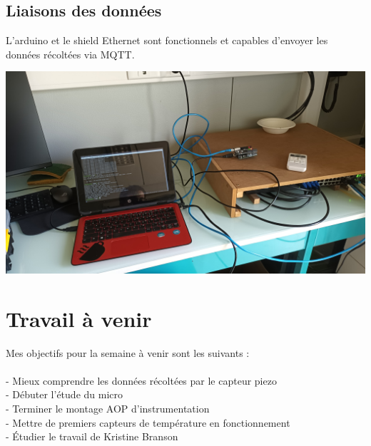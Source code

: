 \documentclass[12pt]{article}
\begin{document}
\subsection{Liaisons des données}
L'arduino et le shield Ethernet sont fonctionnels et capables d'envoyer les données récoltées via MQTT.
\begin{center}	
	\includegraphics[scale=0.08]{shieldethernet.jpg}
	\label{image5}
\end{center}
\section{Travail à venir}
Mes objectifs pour la semaine à venir sont les suivants :\\
\\
	- Mieux comprendre les données récoltées par le capteur piezo\\
	- Débuter l'étude du micro\\
	- Terminer le montage AOP d'instrumentation\\
	- Mettre de premiers capteurs de température en fonctionnement\\
	- Étudier le travail de Kristine Branson\\

\newpage
\listoffigures
\end{document}
